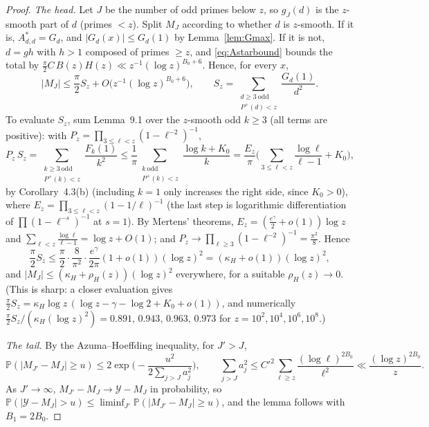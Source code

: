 \documentclass[11pt]{amsart}
\theoremstyle{remark}
\newcommand{\Prob}{\mathbb{P}}
\begin{document}
\begin{proof}
\emph{The head.} Let $J$ be the number of odd primes below $z$, so $g_J(d)$ is the $z$-smooth part of $d$ (primes $<z$). Split $M_J$ according to whether $d$ is $z$-smooth. If it is, $A^*_{d,d}=G_d$, and $|G_d(x)|\le G_d(1)$ by Lemma~\ref{lem:Gmax}. If it is not, $d=gh$ with $h>1$ composed of primes $\ge z$, and \eqref{eq:Astarbound} bounds the total by $\frac\pi2C\,B(z)H(z)\ll z^{-1}(\log z)^{B_0+6}$. Hence, for every $x$,
\[
|M_J|\le\frac\pi2S_z+O\big(z^{-1}(\log z)^{B_0+6}\big),\qquad S_z=\sum_{\substack{d\ge3\ \mathrm{odd}\\ P^+(d)<z}}\frac{G_d(1)}{d^2}.
\]
To evaluate $S_z$, sum Lemma~9.1 over the $z$-smooth odd $k\ge3$ (all terms are positive): with $P_z=\prod_{3\le\ell<z}(1-\ell^{-2})^{-1}$,
\[
P_z\,S_z=\sum_{\substack{k\ge3\ \mathrm{odd}\\ P^+(k)<z}}\frac{F_k(1)}{k^2}\le\frac1\pi\sum_{\substack{k\ \mathrm{odd}\\ P^+(k)<z}}\frac{\log k+K_0}k
=\frac{E_z}\pi\Big(\sum_{3\le\ell<z}\frac{\log\ell}{\ell-1}+K_0\Big),
\]
by Corollary~4.3(b) (including $k=1$ only increases the right side, since $K_0>0$), where $E_z=\prod_{3\le\ell<z}(1-1/\ell)^{-1}$ (the last step is logarithmic differentiation of $\prod(1-\ell^{-s})^{-1}$ at $s=1$). By Mertens' theorems, $E_z=(\frac{e^\gamma}2+o(1))\log z$ and $\sum_{\ell<z}\frac{\log\ell}{\ell-1}=\log z+O(1)$; and $P_z\to\prod_{\ell\ge3}(1-\ell^{-2})^{-1}=\frac{\pi^2}8$. Hence
\[
\frac\pi2S_z\le\frac\pi2\cdot\frac8{\pi^2}\cdot\frac{e^\gamma}{2\pi}(1+o(1))(\log z)^2=(\kappa_H+o(1))(\log z)^2,
\]
and $|M_J|\le(\kappa_H+\rho_H(z))(\log z)^2$ everywhere, for a suitable $\rho_H(z)\to0$. (This is sharp: a closer evaluation gives $\frac\pi2S_z=\kappa_H\log z\,(\log z-\gamma-\log2+K_0+o(1))$, and numerically $\frac\pi2S_z/(\kappa_H(\log z)^2)=0.891,\,0.943,\,0.963,\,0.973$ for $z=10^2,10^4,10^6,10^8$.)

\emph{The tail.} By the Azuma--Hoeffding inequality, for $J'>J$,
\[
\Prob(|M_{J'}-M_J|\ge u)\le2\exp\Big(-\frac{u^2}{2\sum_{j>J}a_j^2}\Big),\qquad\sum_{j>J}a_j^2\le C'^2\sum_{\ell\ge z}\frac{(\log\ell)^{2B_0}}{\ell^2}\ll\frac{(\log z)^{2B_0}}z .
\]
As $J'\to\infty$, $M_{J'}-M_J\to \mathcal Y-M_J$ in probability, so $\Prob(|\mathcal Y-M_J|>u)\le\liminf_{J'}\Prob(|M_{J'}-M_J|\ge u)$, and the lemma follows with $B_1=2B_0$.
\end{proof}
\end{document}
